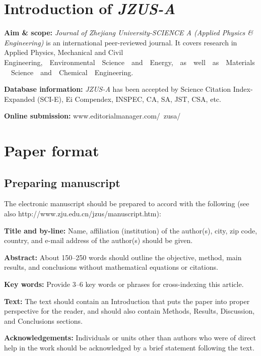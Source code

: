\documentclass[twoside,twocolumn]{article}
\begin{document}
\section{Introduction of \emph{JZUS-A}}

\noindent \textbf{Aim \& scope:}  \emph{Journal of Zhejiang University-SCIENCE A (Applied Physics {\sf \slshape \&} Engineering)} is an international peer-reviewed journal. It covers research in Applied Physics, Mechanical and Civil Engineering,\ \ Environmental\ \ Science\ \ and\ \ Energy,\ \ as\ \ well\ \ as\ \ Materials\ \ Science\ \ and\ \ Chemical\ \ Engineering.

\noindent \textbf{Database information:} \emph{JZUS-A} has been accepted by Science Citation Index-Expanded (SCI-E), Ei Compendex, INSPEC, CA, SA, JST, CSA, etc.

\noindent \textbf{Online submission:} www.editorialmanager.com/\ zusa/

\section{Paper format}

\subsection{Preparing manuscript}

The electronic manuscript should be prepared to accord with the following (see also http://www.zju.edu.cn/jzus/manuscript.htm):

\noindent \textbf{Title and by-line:} Name, affiliation (institution) of the author(s), city, zip code, country, and e-mail address of the author(s) should be given.

\noindent \textbf{Abstract:} About 150--250 words should outline the objective, method, main results, and conclusions without mathematical equations or citations.

\noindent \textbf{Key words:} Provide 3--6 key words or phrases for cross-indexing this article.

\noindent \textbf{Text:} The text should contain an Introduction that puts the paper into proper perspective for the reader, and should also contain Methods, Results, Discussion, and Conclusions sections.

\noindent \textbf{Acknowledgements:} Individuals or units other than authors who were of direct help in the work should be acknowledged by a brief statement following the text.
\end{document}
